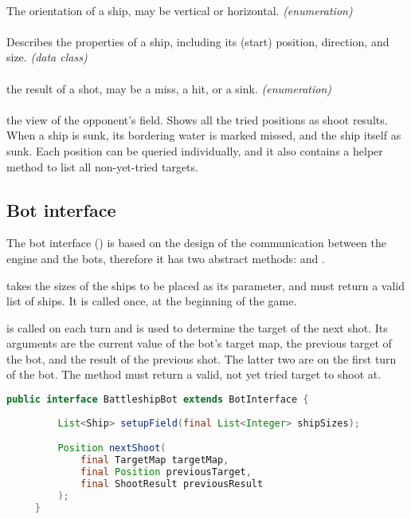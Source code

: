 				\paragraph{} The orientation of a ship, may be vertical or horizontal. \emph{(enumeration)}
				
				\paragraph{} Describes the properties of a ship, including its (start) position, direction, and size. \emph{(data class)}
				
				\paragraph{} the result of a shot, may be a miss, a hit, or a sink. \emph{(enumeration)}
				
				\paragraph{} the view of the opponent's field. Shows all the tried positions as shoot results. When a ship is sunk, its bordering water is marked missed, and the ship itself as sunk. Each position can be queried individually, and it also contains a helper method to list all non-yet-tried targets.
			
			\subsection{Bot interface}
			
			The bot interface () is based on the design of the communication between the engine and the bots, therefore it has two abstract methods:  and .

			 takes the sizes of the ships to be placed as its parameter, and must return a valid list of ships. It is called once, at the beginning of the game.
			
			 is called on each turn and is used to determine the target of the next shot. Its arguments are the current value of the bot's target map, the previous target of the bot, and the result of the previous shot. The latter two are  on the first turn of the bot. The method must return a valid, not yet tried target to shoot at.
		
			\begin{center}
				\begin{minipage}{13cm}
		\begin{lstlisting}[language=Java, title={\code{BattleshipBot.java}}]
	 public interface BattleshipBot extends BotInterface {
	    
	     List<Ship> setupField(final List<Integer> shipSizes);

	 	 Position nextShoot(
	 		 final TargetMap targetMap,
			 final Position previousTarget,
    		 final ShootResult previousResult
		 );
	 }
		\end{lstlisting}
				\end{minipage}
			\end{center}
		
